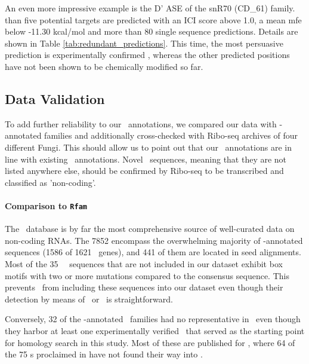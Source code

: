 An even more impressive example is the D' ASE of the snR70 (CD\_61)
family.   than five potential targets are predicted with an ICI
score above 1.0, a mean mfe below -11.30 kcal/mol and more than 80 single
sequence predictions. Details are shown in Table
\ref{tab:redundant_predictions}. This time, the most persuasive prediction
is experimentally confirmed \cite{Lowe:1999}, whereas the other predicted
positions have not been shown to be chemically modified so far.

\subsection{Data Validation}

To add further reliability to our \sno\ annotations, we compared our data
with \rfam -annotated families and additionally cross-checked with Ribo-seq
archives of four different Fungi. This should allow us to point out that
our \snostrip\ annotations are in line with existing \rfam\
annotations. Novel \sno\ sequences, meaning that they are not listed
anywhere else, should be confirmed by Ribo-seq to be transcribed and
classified as 'non-coding'.
 
\paragraph{\textbf{Comparison to \texttt{Rfam}}}
The \rfam\ database \cite{Nawrocki:2015} is by far the most
comprehensive source of well-curated data on non-coding RNAs. The 7852
\PFS{\sno s detected by \snostrip} encompass the overwhelming majority
of \rfam -annotated sequences (1586 of 1621 \sno\ genes), and 441 of
them are located in seed alignments.  Most of the 35 \rfam\ \sno\
sequences that are not included in our dataset exhibit box motifs with
two or more mutations compared to the consensus sequence. This
prevents \snostrip\ from including these sequences into our dataset
even though their detection by means of \blast\ or \infernal\ is
straightforward.

Conversely, 32 of the \snostrip -annotated \sno\ families had no
representative in \rfam\ even though they harbor at least one
experimentally verified \sno\ that served as the starting point for
homology search in this study. Most of these are published for \ncr, where
64 of the 75 \sno s proclaimed in \cite{Liu:2009} have not found their way
into \rfam.

